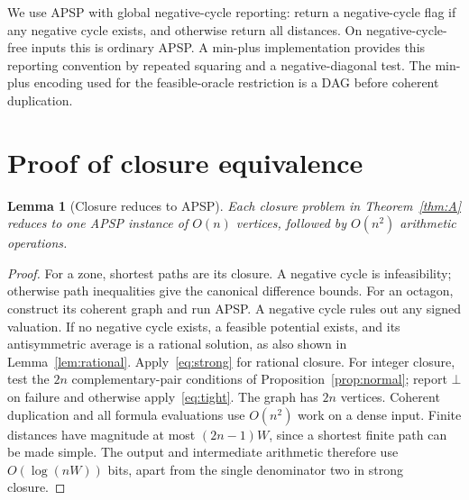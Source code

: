 \documentclass[manuscript,11pt,screen,nonacm]{acmart}
\newtheorem{lemma}[theorem]{Lemma}
\theoremstyle{definition}
\begin{document}
We use APSP with global negative-cycle reporting: return a negative-cycle flag if any negative cycle exists, and otherwise return all distances. On negative-cycle-free inputs this is ordinary APSP. A min-plus implementation provides this reporting convention by repeated squaring and a negative-diagonal test. The min-plus encoding used for the feasible-oracle restriction is a DAG before coherent duplication.

\section{Proof of closure equivalence}\label{sec:closureproof}
\begin{lemma}[Closure reduces to APSP]\label{lem:upper}
Each closure problem in Theorem~\ref{thm:A} reduces to one APSP instance of $O(n)$ vertices, followed by $O(n^2)$ arithmetic operations.
\end{lemma}
\begin{proof}
For a zone, shortest paths are its closure. A negative cycle is infeasibility; otherwise path inequalities give the canonical difference bounds. For an octagon, construct its coherent graph and run APSP. A negative cycle rules out any signed valuation. If no negative cycle exists, a feasible potential exists, and its antisymmetric average is a rational solution, as also shown in Lemma~\ref{lem:rational}. Apply~\eqref{eq:strong} for rational closure. For integer closure, test the $2n$ complementary-pair conditions of Proposition~\ref{prop:normal}; report $\bot$ on failure and otherwise apply~\eqref{eq:tight}. The graph has $2n$ vertices. Coherent duplication and all formula evaluations use $O(n^2)$ work on a dense input. Finite distances have magnitude at most $(2n-1)W$, since a shortest finite path can be made simple. The output and intermediate arithmetic therefore use $O(\log(nW))$ bits, apart from the single denominator two in strong closure.
\end{proof}
\end{document}
